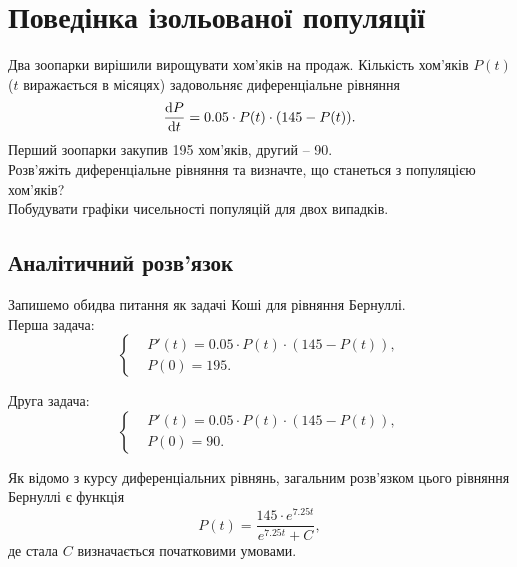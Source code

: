




\tableofcontents

\section{Поведінка ізольованої популяції}

Два зоопарки вирішили вирощувати хом'яків на продаж. Кількість хом'яків $P(t)$ ($t$ виражається в місяцях) задовольняє диференціальне рівняння \[ \frac{\mathop{}\!\mathrm{d} P}{\mathop{}\!\mathrm{d} t} = 0.05 \cdot P(t) \cdot (145 - P(t)). \] Перший зоопарки закупив 195 хом'яків, другий -- 90. \\

Розв'яжіть диференціальне рівняння та визначте, що станеться з популяцією хом'яків? \\

Побудувати графіки чисельності популяцій для двох випадків.

\subsection{Аналітичний розв'язок}

Запишемо обидва питання як задачі Коші для рівняння Бернуллі. \\

Перша задача:
\begin{equation*}
	\left\{
		\begin{aligned}
			& P'(t) = 0.05 \cdot P(t) \cdot (145 - P(t)), \\
			& P(0) = 195.
		\end{aligned}
	\right.
\end{equation*}

Друга задача:
\begin{equation*}
	\left\{
		\begin{aligned}
			& P'(t) = 0.05 \cdot P(t) \cdot (145 - P(t)), \\
			& P(0) = 90.
		\end{aligned}
	\right.
\end{equation*}

Як відомо з курсу диференціальних рівнянь, загальним розв'язком цього рівняння Бернуллі є функція
\begin{equation*}
	P(t) = \frac{145 \cdot e^{7.25 t}}{e^{7.25 t} + C},
\end{equation*}
де стала $C$ визначається початковими умовами. \\

